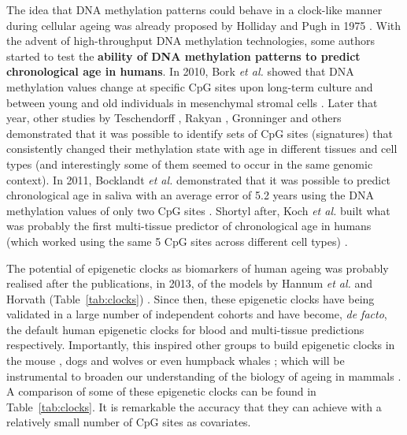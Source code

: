 \bigskip

The idea that DNA methylation patterns could behave in a clock-like manner during cellular ageing was already proposed by Holliday and Pugh in 1975 \cite{Holliday1975}. With the advent of high-throughput DNA methylation technologies, some authors started to test the \textbf{ability of DNA methylation patterns to predict chronological age in humans}. In 2010, Bork \textit{et al.} showed that DNA methylation values change at specific CpG sites upon long-term culture and between young and old individuals in mesenchymal stromal cells \cite{Bork2010}. Later that year, other studies by Teschendorff \cite{Teschendorff2010}, Rakyan \cite{Rakyan2010}, Gronninger \cite{Gronniger2010} and others demonstrated that it was possible to identify sets of CpG sites (signatures) that consistently changed their methylation state with age in different tissues and cell types (and interestingly some of them seemed to occur in the same genomic context). In 2011, Bocklandt \textit{et al.} demonstrated that it was possible to predict chronological age in saliva with an average error of 5.2 years using the DNA methylation values of only two CpG sites \cite{Bocklandt2011}. Shortyl after, Koch \textit{et al.} built what was probably the first multi-tissue predictor of chronological age in humans (which worked using the same 5 CpG sites across different cell types) \cite{Koch2011}. 

\bigskip

The potential of epigenetic clocks as biomarkers of human ageing was probably realised after the publications, in 2013, of the models by Hannum \textit{et al.} \cite{Hannum2013} and Horvath (Table~\ref{tab:clocks}) \cite{Horvath2013}. Since then, these epigenetic clocks have being validated in a large number of independent cohorts and have become, \textit{de facto}, the default human epigenetic clocks for blood and multi-tissue predictions respectively. Importantly, this inspired other groups to build epigenetic clocks in the mouse \cite{Wang2017,Stubbs2017,Petkovich2017,Thompson2018,Meer2018}, dogs and wolves \cite{Thompson2017} or even humpback whales \cite{Polanowski2014}; which will be instrumental to broaden our understanding of the biology of ageing in mammals \cite{Stubbs2017}. A comparison of some of these epigenetic clocks can be found in Table~\ref{tab:clocks}. It is remarkable the accuracy that they can achieve with a relatively small number of CpG sites as covariates.

\bigskip

